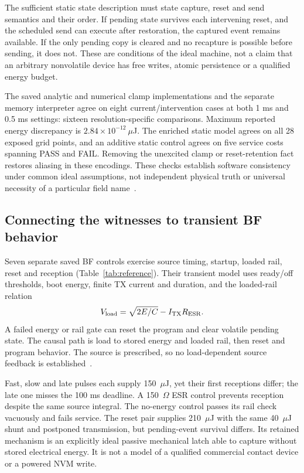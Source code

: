 The sufficient static state description must state capture, reset and send
semantics and their order. If pending state survives each intervening reset,
and the scheduled send can execute after restoration, the captured event
remains available. If the only pending copy is cleared and no recapture is
possible before sending, it does not. These are conditions of the ideal
machine, not a claim that an arbitrary nonvolatile device has free writes,
atomic persistence or a qualified energy budget.



The saved analytic and numerical clamp implementations and the separate
memory interpreter agree on eight current/intervention cases at both 1 ms
and 0.5 ms settings: sixteen resolution-specific comparisons. Maximum
reported energy discrepancy is $2.84\times10^{-12}~\mu$J. The enriched
static model agrees on all 28 exposed grid points, and an additive static
control agrees on five service costs spanning PASS and FAIL. Removing the
unexcited clamp or reset-retention fact restores aliasing in these encodings.
These checks establish software consistency under common ideal assumptions,
not independent physical truth or universal necessity of a particular field
name~\cite{structural}.

\subsection{Connecting the witnesses to transient BF behavior}
Seven separate saved BF controls exercise source timing, startup, loaded
rail, reset and reception (Table~\ref{tab:reference}). Their transient model
uses ready/off thresholds, boot energy, finite TX current and duration, and
the loaded-rail relation
\begin{equation}
 V_{\rm load}=\sqrt{2E/C}-I_{\rm TX}R_{\rm ESR}.
\end{equation}
A failed energy or rail gate can reset the program and clear volatile
pending state. The causal path is load to stored energy and loaded rail,
then reset and program behavior. The source is prescribed, so no
load-dependent source feedback is established~\cite{mechanisms}.



Fast, slow and late pulses each supply 150~$\mu$J, yet their first
receptions differ; the late one misses the 100 ms deadline. A 150~$\Omega$
ESR control prevents reception despite the same source integral. The
no-energy control passes its rail check vacuously and fails service.
The reset pair supplies 210~$\mu$J with the same 40~$\mu$J shunt and
postponed transmission, but pending-event survival differs. Its retained
mechanism is an explicitly ideal passive mechanical latch able to capture
without stored electrical energy. It is not a model of a qualified
commercial contact device or a powered NVM write.

